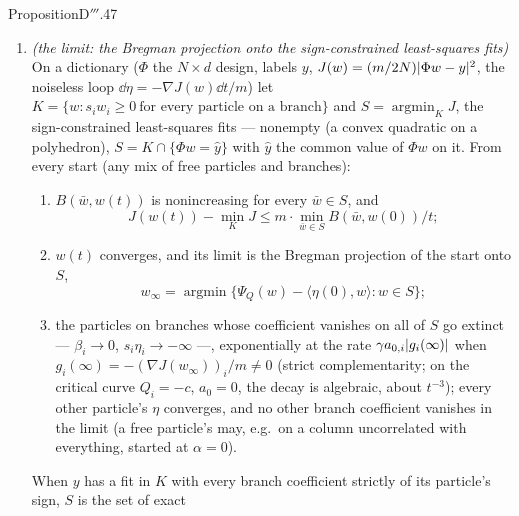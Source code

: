\begin{thm}{Proposition}{D$'''$.47}
\begin{enumerate}[label=\textup{(\roman*)}]
    $\abs w\to\infty$ an entropy with the temperature $1/(\gamma a_{\max})$ (\hyperref[res:thmDppp:45]{D$'''$.45}(ii)'s
    tail). $\psi_i$ is finite at 0, $\psi_i(0) = (Q_i + c)/(\gamma m)$, with an infinite slope there (a barrier: the
    sign is frozen), and the Bregman divergence from 0 is the particle's mass,
    \[
      B_i(0,w_i) = \beta_i/(\gamma m).
    \]
    Near its branch point the particle runs the unnormalised exponentiated gradient: its amplitude frozen near $a_0$,
    $\beta_i\approx\beta_i(0)\exp(\gamma a_{0,i}\int g_i\dd t)$. (On the critical curve $Q_i = -c$ the two branches meet
    at $\alpha = 0$, $a_0 = 0$, and the barrier is a power, $\eta\propto-\abs w^{-1/3}$.)
  \item \emph{(the limit: the Bregman projection onto the sign-constrained least-squares fits)} On a dictionary ($\Phi$
    the $N\times d$ design, labels $y$, $J(w) = (m/2N)\lvert \Phi w - y\rvert^2$, the noiseless loop
    $\dd\eta = -\nabla J(w)\dd t/m$) let $K = \{w : s_iw_i\ge0\ \text{for every particle on a branch}\}$ and
    $S = \operatorname{argmin}_KJ$, the sign-constrained least-squares fits --- nonempty (a convex quadratic on a
    polyhedron), $S = K\cap\{\Phi w = \hat y\}$ with $\hat y$ the common value of $\Phi w$ on it. From every start (any
    mix of free particles and branches):
    \begin{enumerate}[label=\textup{(\alph*)}]
      \item $B(\bar w,w(t))$ is nonincreasing for every $\bar w\in S$, and
        \[
          J(w(t)) - \min_KJ\le m\cdot\min_{\bar w\in S}B(\bar w,w(0))/t;
        \]
      \item $w(t)$ converges, and its limit is the Bregman projection of the start onto $S$,
        \[
          w_\infty = \operatorname{argmin}\{\Psi_Q(w) - \langle\eta(0),w\rangle : w\in S\};
        \]
      \item the particles on branches whose coefficient vanishes on all of $S$ go extinct --- $\beta_i\to0$,
        $s_i\eta_i\to-\infty$ ---, exponentially at the rate $\gamma a_{0,i}\lvert g_i(\infty)\rvert$ when
        $g_i(\infty) = -(\nabla J(w_\infty))_i/m\ne0$ (strict complementarity; on the critical curve $Q_i = -c$,
        $a_0 = 0$, the decay is algebraic, about $t^{-3}$); every other particle's $\eta$ converges, and no other branch
        coefficient vanishes in the limit (a free particle's may, e.g.\ on a column uncorrelated with everything,
        started at $\alpha = 0$).
    \end{enumerate}
    When $y$ has a fit in $K$ with every branch coefficient strictly of its particle's sign, $S$ is the set of exact

\end{enumerate}
\end{thm}
